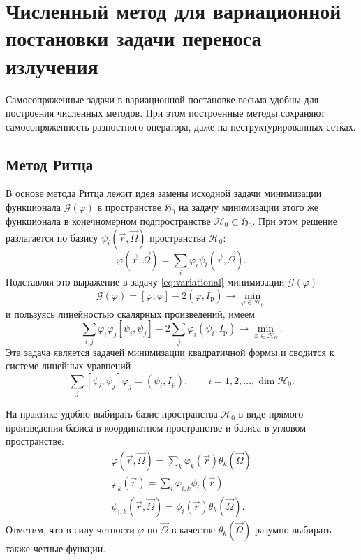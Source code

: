 \chapter{Численный метод для вариационной постановки задачи переноса излучения}

Самосопряженные задачи в вариационной постановке весьма удобны для построения численных методов. При этом построенные методы сохраняют самосопряженность разностного оператора, даже на неструктурированных сетках. 

\section{Метод Ритца}

В основе метода Ритца \cite{marchuk1981} лежит идея замены исходной задачи минимизации функционала $\mathcal{G}(\varphi)$ в пространстве $\mathfrak{H}_0$ на задачу минимизации этого же функционала в конечномерном подпространстве $\mathcal{H}_0 \subset \mathfrak{H}_0$. При этом решение разлагается по базису $\psi_i(\vec r, \vec \Omega)$ пространства $\mathcal{H}_0$:
\[
\varphi(\vec r, \vec \Omega) = \sum_i \varphi_i \psi_i(\vec r, \vec \Omega).
\]
Подставляя это выражение в задачу \eqref{eq:variational} минимизации $\mathcal{G}(\varphi)$
\[
\mathcal{G}(\varphi) = [\varphi, \varphi] - 2 (\varphi, I_\text{p}) \to \min_{\varphi \in \mathcal{H}_0}
\label{eq:minimize}
\]
и пользуясь линейностью скалярных произведений, имеем
\[
\sum_{i,j} \varphi_{i}\varphi_{j} [\psi_i, \psi_j] - 2 \sum_{j} \varphi_i(\psi_i, I_\text{p})\to \min_{\varphi \in \mathcal{H}_0}.
\]
Эта задача является задачей минимизации квадратичной формы и сводится к системе линейных уравнений
\begin{equation*}
\sum_{j} [\psi_i, \psi_j] \varphi_j = (\psi_i, I_\text{p}), \qquad i = 1, 2, \dots, \operatorname{dim} \mathcal{H}_0.
\end{equation*}

На практике удобно выбирать базис пространства $\mathcal{H}_0$ в виде прямого произведения базиса в координатном пространстве и базиса в угловом пространстве:
\begin{gather}
\varphi(\vec r, \vec \Omega) = \sum_k \varphi_{k}(\vec r)\theta_k(\vec \Omega)\\
\varphi_k(\vec r) = \sum_i \varphi_{i,k} \phi_i(\vec r)\\
\psi_{i,k}(\vec r, \vec \Omega) = \phi_i(\vec r) \theta_k (\vec \Omega).
\label{eq:discrete}
\end{gather}
Отметим, что в силу четности $\varphi$ по $\vec \Omega$ в качестве $\theta_k(\vec \Omega)$ разумно выбирать также четные функции.


